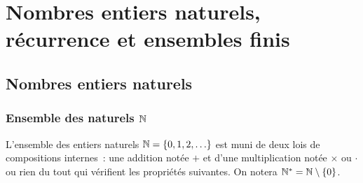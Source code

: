 \chapter{Nombres entiers naturels, récurrence et ensembles finis}
\minitoc
\minilof
\minilot
\label{chap:naturels}
\section{Nombres entiers naturels}

\subsection{Ensemble des naturels \(\mathbb{N}\)}

L'ensemble des entiers naturels \(\mathbb{N}=\{0,1,2,\ldots\}\) est muni de deux lois de compositions internes~: une addition notée \(+\) et d'une multiplication notée \(\times\) ou \(\cdot\) ou rien du tout qui vérifient les propriétés suivantes. On notera \(\mathbb{N}^*=\mathbb{N}\setminus\{0\}\).

